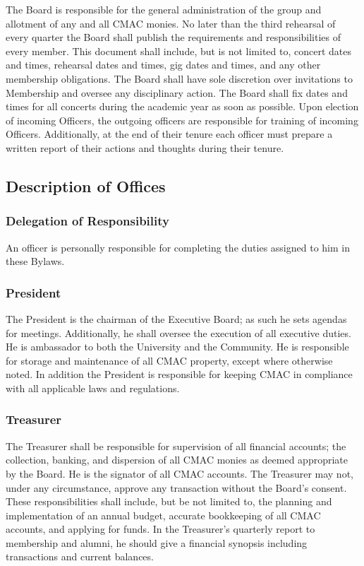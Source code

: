 \documentclass{article}
\begin{document}
The Board is responsible for the general administration of the group
and allotment of any and all CMAC monies. No later than the third
rehearsal of every quarter the Board shall publish the requirements
and responsibilities of every member. This document shall include,
but is not limited to, concert dates and times, rehearsal dates and
times, gig dates and times, and any other membership obligations.
The Board shall have sole discretion over invitations to Membership
and oversee any disciplinary action. The Board shall fix dates and
times for all concerts during the academic year as soon as possible.
Upon election of incoming Officers, the outgoing officers are responsible
for training of incoming Officers. Additionally, at the end of their
tenure each officer must prepare a written report of their actions
and thoughts during their tenure.

\subsection{Description of Offices}

\subsubsection{Delegation of Responsibility}

An officer is personally responsible for completing the duties assigned
to him in these Bylaws.

\subsubsection{President}

The President is the chairman of the Executive Board; as such he sets agendas
for meetings. Additionally, he shall oversee the execution of all executive
duties. He is ambassador to both the University and the Community. He is
responsible for storage and maintenance of all CMAC property, except where
otherwise noted. In addition the President is responsible for keeping CMAC in
compliance with all applicable laws and regulations.

\subsubsection{Treasurer}

The Treasurer shall be responsible for supervision of all financial
accounts; the collection, banking, and dispersion of all CMAC monies
as deemed appropriate by the Board. He is the signator of all CMAC
accounts. The Treasurer may not, under any circumstance, approve any
transaction without the Board's consent. These responsibilities shall
include, but be not limited to, the planning and implementation of
an annual budget, accurate bookkeeping of all CMAC accounts, and applying
for funds. In the Treasurer's quarterly report to membership and alumni,
he should give a financial synopsis including transactions and current
balances.
\end{document}
